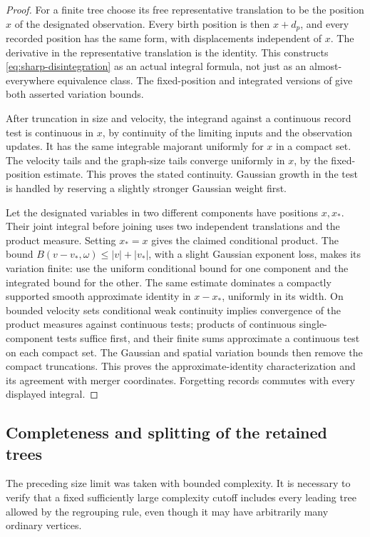 \begin{proof}
For a finite tree choose its free representative translation to
be the position \(x\) of the designated observation.  Every
birth position is then \(x+d_p\), and every recorded position
has the same form, with displacements independent of \(x\).
The derivative in the representative translation is the identity.
This constructs \eqref{eq:sharp-disintegration} as an actual
integral formula, not just as an almost-everywhere equivalence
class.  The fixed-position and integrated versions of
 give both asserted variation bounds.

After truncation in size and velocity, the integrand against a
continuous record test is continuous in \(x\), by continuity of
the limiting inputs and the observation updates.  It has the
same integrable majorant uniformly for \(x\) in a compact set.
The velocity tails and the graph-size tails converge uniformly
in \(x\), by the fixed-position estimate.  This proves the
stated continuity.  Gaussian growth in the test is handled by
reserving a slightly stronger Gaussian weight first.

Let the designated variables in two different components have
positions \(x,x_*\).  Their joint integral before joining uses
two independent translations and the product measure.  Setting
\(x_*=x\) gives the claimed conditional product.  The bound
\(B(v-v_*,\omega)\le |v|+|v_*|\), with a slight Gaussian
exponent loss, makes its variation finite: use the uniform
conditional bound for one component and the integrated bound
for the other.  The same estimate dominates a compactly
supported smooth approximate identity in \(x-x_*\), uniformly
in its width.  On bounded velocity sets conditional weak
continuity implies convergence of the product measures against
continuous tests; products of continuous single-component
tests suffice first, and their finite sums approximate a
continuous test on each compact set.  The Gaussian and spatial
variation bounds then remove the compact truncations.  This
proves the approximate-identity characterization and its
agreement with merger coordinates.  Forgetting records commutes
with every displayed integral.
\end{proof}

\subsection{Completeness and splitting of the retained trees}

The preceding size limit was taken with bounded complexity.  It
is necessary to verify that a fixed sufficiently large complexity
cutoff includes every leading tree allowed by the regrouping rule,
even though it may have arbitrarily many ordinary vertices.

